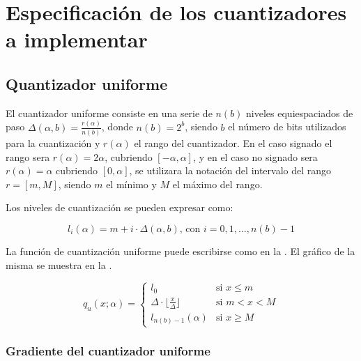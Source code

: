 \section{Especificación de los cuantizadores a implementar}

\subsection{Quantizador uniforme}
\label{sec:uniform}

El cuantizador uniforme consiste en una serie de $n\left(b\right)$ niveles equiespaciados de paso $\Delta\left(\alpha, b\right) = \frac{r\left(\alpha\right)}{n\left(b\right)}$, donde $n\left(b\right) = 2^b$, siendo $b$ el número de bits utilizados para la cuantización y $r\left(\alpha\right)$ el rango del cuantizador. En el caso signado el rango sera $r(\alpha) = 2 \alpha$, cubriendo $[-\alpha, \alpha]$, y en el caso no signado sera $r(\alpha) = \alpha$ cubriendo $[0, \alpha]$, se utilizara la notación del intervalo del rango $r = [m, M]$, siendo $m$ el mínimo y $M$ el máximo del rango.

Los niveles de cuantización se pueden expresar como:

\begin{equation}
    \label{eq:uniform_quantizer_level_value}
    l_i\left(\alpha\right) = m + i \cdot \Delta\left(\alpha, b\right) \text{, con } i = 0, 1, \ldots, n\left(b\right) - 1
\end{equation}

La función de cuantización uniforme puede escribirse como en la . El gráfico de la misma se muestra en la .

\begin{equation}
    \label{eq:uniform_quantizer_signed}
    q_u(x; \alpha) =
    \begin{cases}
        l_{0} & \text{si $x \leq m$} \\
        \Delta \cdot \lfloor \frac{x}{\Delta} \rfloor & \text{si } m < x < M \\
        l_{n\left(b\right) - 1}\left(\alpha\right) & \text{si } x \geq M
    \end{cases}
\end{equation}


\subsubsection{Gradiente del cuantizador uniforme}

